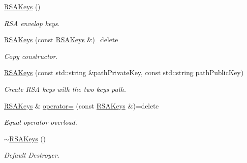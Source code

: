 \begin{DoxyCompactItemize}
\item 
\hyperlink{class_spider_1_1ssl_1_1_r_s_a_keys_a656fbf95f4ea432cbdbe40c4f0cb57f2}{R\+S\+A\+Keys} ()
\begin{DoxyCompactList}\small\item\em R\+SA envelop keys. \end{DoxyCompactList}\item 
\mbox{\label{class_spider_1_1ssl_1_1_r_s_a_keys_a7a6fada6e8459ac0bcc20766f9083bd5}} 
\hyperlink{class_spider_1_1ssl_1_1_r_s_a_keys_a7a6fada6e8459ac0bcc20766f9083bd5}{R\+S\+A\+Keys} (const \hyperlink{class_spider_1_1ssl_1_1_r_s_a_keys}{R\+S\+A\+Keys} \&)=delete
\begin{DoxyCompactList}\small\item\em Copy constructor. \end{DoxyCompactList}\item 
\hyperlink{class_spider_1_1ssl_1_1_r_s_a_keys_a6dbecb26eadd6691d93a5f8d74ddce70}{R\+S\+A\+Keys} (const std\+::string \&path\+Private\+Key, const std\+::string path\+Public\+Key)
\begin{DoxyCompactList}\small\item\em Create R\+SA keys with the two keys path. \end{DoxyCompactList}\item 
\hyperlink{class_spider_1_1ssl_1_1_r_s_a_keys}{R\+S\+A\+Keys} \& \hyperlink{class_spider_1_1ssl_1_1_r_s_a_keys_aa51f09af42c08d805e34bf351f478adc}{operator=} (const \hyperlink{class_spider_1_1ssl_1_1_r_s_a_keys}{R\+S\+A\+Keys} \&)=delete
\begin{DoxyCompactList}\small\item\em Equal operator overload. \end{DoxyCompactList}\item 
\mbox{\label{class_spider_1_1ssl_1_1_r_s_a_keys_ac602db5926f1318399bdc94b436c6c21}} 
\hyperlink{class_spider_1_1ssl_1_1_r_s_a_keys_ac602db5926f1318399bdc94b436c6c21}{$\sim$\+R\+S\+A\+Keys} ()
\begin{DoxyCompactList}\small\item\em Default Destroyer. \end{DoxyCompactList}\item 
\mbox{\label{class_spider_1_1ssl_1_1_r_s_a_keys_acd779c58e9168d10fef5468015af063e}} 

\end{DoxyCompactItemize}
